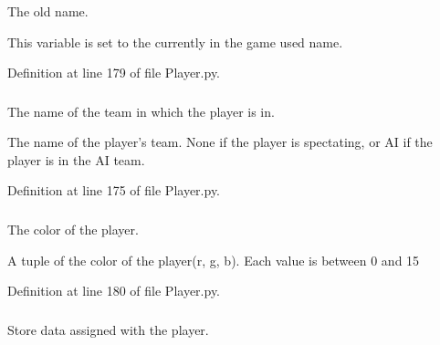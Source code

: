 The old name. 

This variable is set to the currently in the game used name. 

Definition at line 179 of file Player.py.

\hypertarget{class_player_1_1_player_ae01a2cfd1449c211cc6b6ca6d6fce853}{
\subsubsection[{\_\-\_\-team}]{}}
\label{class_player_1_1_player_ae01a2cfd1449c211cc6b6ca6d6fce853}


The name of the team in which the player is in. 

The name of the player's team. None if the player is spectating, or AI if the player is in the AI team. 

Definition at line 175 of file Player.py.

\hypertarget{class_player_1_1_player_a323d688193f511184787b2e598222e74}{
\subsubsection[{color}]{}}
\label{class_player_1_1_player_a323d688193f511184787b2e598222e74}


The color of the player. 

A tuple of the color of the player(r, g, b). Each value is between 0 and 15 

Definition at line 180 of file Player.py.

\hypertarget{class_player_1_1_player_a1a50d6ee0682ff86b83ea314dfa58ce6}{
\subsubsection[{data}]{}}
\label{class_player_1_1_player_a1a50d6ee0682ff86b83ea314dfa58ce6}


Store data assigned with the player. 

